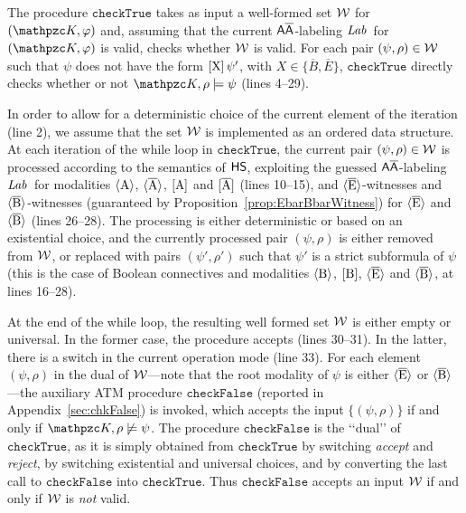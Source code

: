   The procedure $\texttt{checkTrue}$ takes as input a well-formed set  ${\mathcal{W}}$ for $(\Ku,\varphi)$ and, assuming that the current $\mathsf{A\overline{A}}$-labeling $\textit{Lab}\,$ for $(\Ku,\varphi)$ is valid,  checks whether ${\mathcal{W}}$ is valid. For each pair $(\psi,\rho) \in {\mathcal{W}}$ such that $\psi$ does not have the form $\operatorname{\mathopen[ X \mathclose]}\psi'$, with $X\in \{\overline{B},\overline{E}\}$, $\texttt{checkTrue}$ directly checks  whether or not $\Ku,\rho\models \psi$ (lines 4--29). 

  In order to allow for a deterministic choice of the current element of the iteration (line 2), we assume that the set ${\mathcal{W}}$ is implemented as an ordered data structure.
  At each iteration of the while loop in $\texttt{checkTrue}$, 
  the current pair  $(\psi,\rho)\in {\mathcal{W}}$ is processed
   according to the semantics of $\text{\sffamily HS}$, exploiting the guessed $\mathsf{A\overline{A}}$-labeling  $\textit{Lab}\,$ for modalities 
   $\operatorname{\langle A\rangle}$, $\operatorname{\langle \overline{A}\rangle}$, $\operatorname{\mathopen[ A \mathclose]}$ and $\operatorname{\mathopen[ \overline{A} \mathclose]}$ (lines 10--15), and $\operatorname{\langle \overline{E}\rangle}$-witnesses and $\operatorname{\langle \overline{B}\rangle}$-witnesses (guaranteed by Proposition~\ref{prop:EbarBbarWitness}) for $\operatorname{\langle \overline{E}\rangle}$ and $\operatorname{\langle \overline{B}\rangle}$ (lines 26--28).
   The processing is either deterministic or based on an existential choice,
   and the currently processed pair $(\psi,\rho)$  is either removed from ${\mathcal{W}}$, or replaced with pairs $(\psi',\rho')$ such that $\psi'$ is a strict subformula of $\psi$ (this is the case of Boolean connectives and modalities $\operatorname{\langle B\rangle}$, $\operatorname{\mathopen[ B \mathclose]}$, $\operatorname{\langle \overline{E}\rangle}$ and $\operatorname{\langle \overline{B}\rangle}$, at lines 16--28).
   
   At the end of the while loop, the resulting well formed set ${\mathcal{W}}$ is either empty or universal. In the former case, the procedure accepts (lines 30--31). In the latter, 
   there is a switch in the current operation mode (line 33). For each element $(\psi,\rho)$ in the dual of ${\mathcal{W}}$---note that the root modality  of $\psi$ is either $\operatorname{\langle \overline{E}\rangle}$ or $\operatorname{\langle \overline{B}\rangle}$---the auxiliary ATM procedure $\texttt{checkFalse}$ (reported in Appendix~\ref{sec:chkFalse}) is invoked, which accepts the input $\{(\psi,\rho)\}$ if and only if $\Ku,\rho \not\models \psi$. The procedure $\texttt{checkFalse}$ is the \lq\lq dual\rq\rq{} of $\texttt{checkTrue}$, as it is simply obtained from $\texttt{checkTrue}$ by switching \emph{accept} and \emph{reject},  by switching existential and universal choices, and by converting the last call to $\texttt{checkFalse}$ into $\texttt{checkTrue}$. 
  Thus $\texttt{checkFalse}$  accepts an input ${\mathcal{W}}$ if and only if ${\mathcal{W}}$ is \emph{not} valid.
  
